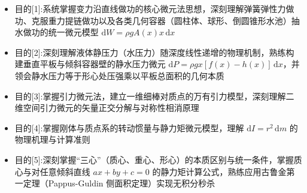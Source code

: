 \documentclass[11pt,a4paper,UTF8]{ctexart}
\begin{document}
\pagestyle{fancy}
\fancyhf{}
\fancyhead[R]{\small\color{TitlePurple}\nouppercase{\leftmark}}
\renewcommand{\headrulewidth}{0.5pt}

\tableofcontents
\newpage
{}


\begin{targetbox}[本章复习目标与核心知识图谱]
\begin{itemize}
  \item 目的[1]:系统掌握变力沿直线做功的核心微元法思想，深刻理解弹簧弹性力做功、克服重力提链做功以及各类几何容器（圆柱体、球形、倒圆锥形水池）抽水做功的统一微元模型 $\mathrm{d}W = \rho g A(x) x\,\mathrm{d}x$
\end{itemize}
\end{targetbox}

\begin{targetbox}[本章复习目标与核心知识图谱]
\begin{itemize}
  \item 目的[2]:深刻理解液体静压力（水压力）随深度线性递增的物理机制，熟练构建垂直平板与倾斜容器壁的静水压力微元 $\mathrm{d}P = \rho g x [f(x) - h(x)]\,\mathrm{d}x$，并领会静水压力等于形心处压强乘以平板总面积的几何本质
\end{itemize}
\end{targetbox}

\begin{targetbox}[本章复习目标与核心知识图谱]
\begin{itemize}
  \item 目的[3]:掌握引力微元法，建立一维细棒对质点的万有引力模型，深刻理解二维空间引力微元的矢量正交分解与对称性相消原理
\end{itemize}
\end{targetbox}

\begin{targetbox}[本章复习目标与核心知识图谱]
\begin{itemize}
  \item 目的[4]:掌握刚体与质点系的转动惯量与静力矩微元模型，理解 $\mathrm{d}I = r^2\,\mathrm{d}m$ 的物理机理与计算准则
\end{itemize}
\end{targetbox}

\begin{targetbox}[本章复习目标与核心知识图谱]
\begin{itemize}
  \item 目的[5]:深刻掌握“三心”（质心、重心、形心）的本质区别与统一条件，掌握质心与对任意倾斜直线 $ax+by+c=0$ 的静力矩计算公式，熟练应用古鲁金第一定理（Pappus-Guldin 侧面积定理）实现无积分秒杀
\end{itemize}
\end{targetbox}
\end{document}
